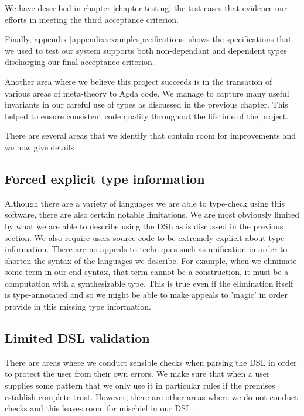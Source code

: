 We have described in chapter \ref{chapter-testing} the test cases that
evidence our efforts in meeting the third acceptance criterion.

Finally, appendix \ref{appendix:examplespecifications} shows the
specifications that we used to test our system supports both
non-dependant and dependent types discharging our final acceptance
criterion.

Another area where we believe this project succeeds is in the
transation of various areas of meta-theory to Agda code. We manage to
capture many useful invariants in our careful use of types as
discussed in the previous chapter. This helped to ensure consistent
code quality throughout the lifetime of the project.

There are several areas that we identify that contain room for
improvements and we now give details 

\subsection{Forced explicit type information}

Although there are a variety of languages we are able to type-check
using this software, there are also certain notable limitations. We
are most obviously limited by what we are able to describe using the
DSL as is discussed in the previous section. We also require users
source code to be extremely explicit about type information. There are
no appeals to techniques such as unification in order to shorten the
syntax of the languages we describe. For example, when we eliminate
some term in our end syntax, that term cannot be a construction, it
must be a computation with a synthesizable type. This is true even if
the elimination itself is type-annotated and so we might be able to
make appeals to 'magic' in order provide in this missing type
information.

\subsection{Limited DSL validation}

There are areas where we conduct sensible checks when parsing the DSL
in order to protect the user from their own errors. We make sure that
when a user supplies some pattern that we only use it in particular
rules if the premises establish complete trust. However, there are
other areas where we do not conduct checks and this leaves room for
mischief in our DSL.

